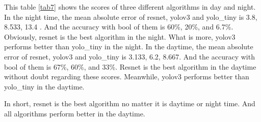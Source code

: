 \documentclass[runningheads]{llncs}
\begin{document}
This table \ref{tab7} shows the scores of three different algorithms in day and night. In the night time, the mean absolute error of resnet, yolov3 and yolo\_tiny is 3.8, 8.533, 13.4 . And the accuracy with bool of them is 60\%, 20\%, and 6.7\%. Obviously, resnet is the best algorithm in the night. What is more, yolov3 performs better than yolo\_tiny in the night.  In the daytime, the mean absolute error of resnet, yolov3 and yolo\_tiny is 3.133, 6.2, 8.667. And the accuracy with bool of them is 67\%, 60\%, and 33\%. Resnet is the best algorithm in the daytime without doubt regarding these scores. Meanwhile, yolov3 performs better than yolo\_tiny in the daytime.

In short, resnet is the best algorithm no matter it is daytime or night time. And all algorithms perform better in the daytime.








\end{document}
